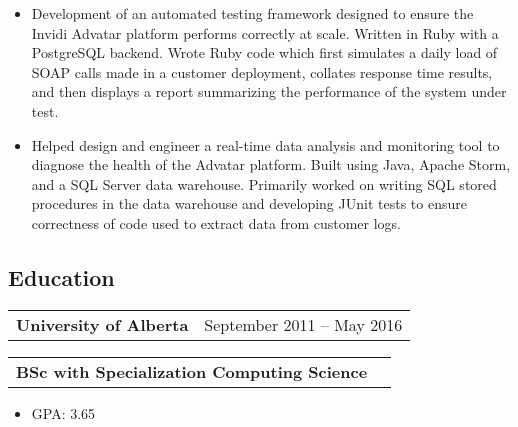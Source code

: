 \documentclass[10pt,letterpaper]{article}
\makeatletter
\newcommand{\headerrow}[2]
{\begin{tabular*}{\linewidth}{l@{\extracolsep{\fill}}r}
	#1 &
	#2 \\
\end{tabular*}}
\makeatother
\begin{document}
       \begin{itemize}
          \itemsep0em
                \item Development of an automated testing framework designed to ensure the Invidi Advatar platform performs correctly at scale. Written in Ruby with a PostgreSQL backend. Wrote Ruby code which first simulates a daily load of SOAP calls made in a customer deployment, collates response time results, and then displays a report summarizing the performance of the system under test.
                \item Helped design and engineer a real-time data analysis and monitoring tool to diagnose the health of the Advatar platform. Built  using Java, Apache Storm, and a SQL Server data warehouse. Primarily worked on writing SQL stored procedures in the data warehouse and developing JUnit tests to ensure correctness of code used to extract data from customer logs.
        \end{itemize}
\vspace{-1em}
\subsection*{Education}
	\headerrow
		{\textbf{University of Alberta}}
		{September 2011 -- May 2016}
	\headerrow
		{\textbf{BSc with Specialization Computing Science}}
		{}
	\begin{itemize}
          \itemsep0em
          \item GPA: 3.65
	\end{itemize}
\vspace{-1em}
\vspace{-0.45em}
\end{document}
